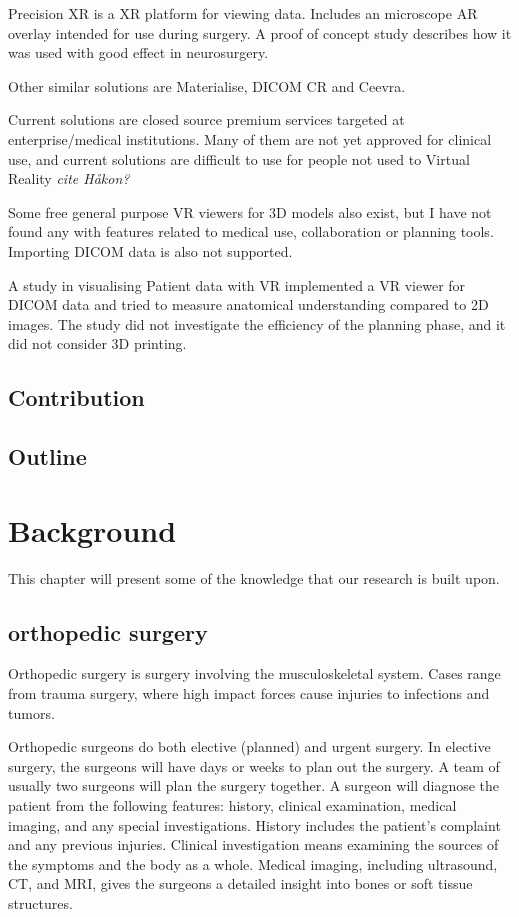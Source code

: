 \documentclass[a4paper]{report}
\begin{document}
Precision XR is a XR platform for viewing data\cite{surgical theater}. Includes an microscope AR overlay intended for use during surgery. A proof of concept study describes how it was used with good effect in neurosurgery\cite{thejns}.

Other similar solutions are Materialise\cite{materialise_medical_nodate}, DICOM CR\cite{dicomvr} and
Ceevra\cite{ceevra_inc_using_2019}.

Current solutions are closed source premium services targeted at enterprise/medical institutions. Many of them are not yet approved for clinical use, and current solutions are difficult to use for people not used to Virtual Reality \emph{cite Håkon?}

Some free general purpose VR viewers for 3D models also exist, but I have not found any with features related to medical use, collaboration or planning tools. Importing DICOM data is also not supported.

A study in visualising Patient data with VR\cite{vertemati_virtual_2019} implemented a VR viewer for DICOM data and tried to measure anatomical understanding compared to 2D images. The study did not investigate the efficiency of the planning phase, and it did not consider 3D printing.

\section{Contribution}
\section{Outline}

\chapter{Background}\label{Background}
This chapter will present some of the knowledge that our research is built upon. 

\section{orthopedic surgery}

Orthopedic surgery is surgery involving the musculoskeletal system. Cases range from trauma surgery, where high impact forces cause injuries to infections and tumors\cite{manual ortho}.

Orthopedic surgeons do both elective (planned) and urgent surgery. In elective surgery, the surgeons will have days or weeks to plan out the surgery. A team of usually two surgeons will plan the surgery together.
A surgeon will diagnose the patient from the following features: history, clinical examination, medical imaging, and any special investigations. History includes the patient's complaint and any previous injuries. Clinical investigation means examining the sources of the symptoms and the body as a whole. Medical imaging, including ultrasound, CT, and MRI, gives the surgeons a detailed insight into bones or soft tissue structures.
\end{document}
